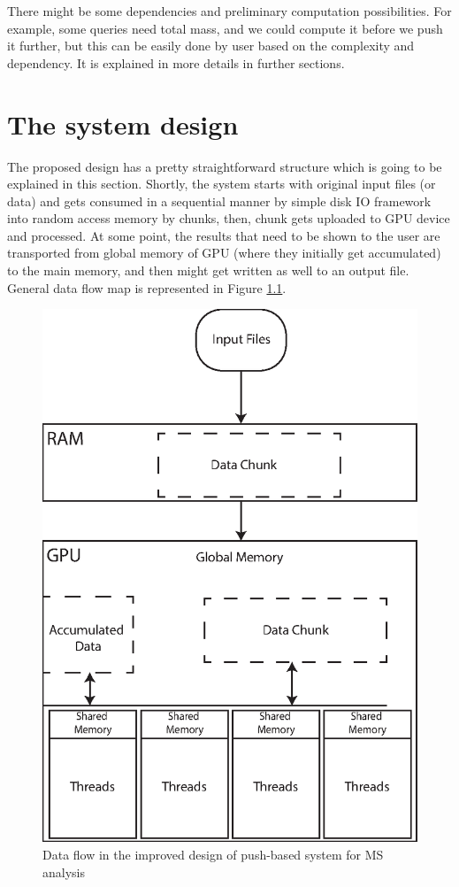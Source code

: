 \documentclass[12pt,letterpaper]{report}
\begin{document}
There might be some dependencies and preliminary computation possibilities. For example, some queries need total mass, and we could compute it before we push it further, but this can be easily done by user based on the complexity and dependency. It is explained in more details in further sections.

\chapter{The system design}\label{sc:system}

\hspace{3em} The proposed design has a pretty straightforward structure which is going to be explained in this section. Shortly, the system starts with original input files (or data) and gets consumed in a sequential manner by simple disk IO framework into random access memory by chunks, then, chunk gets uploaded to GPU device and processed. At some point, the results that need to be shown to the user are transported from global memory of GPU (where they initially get accumulated) to the main memory, and then might get written as well to an output file. General data flow map is represented in Figure  \ref{fg:data-flow}.

\begin{figure}
 \centerline{ \includegraphics[width=0.65\columnwidth]{images/memory-organization.eps} }
 \caption{Data flow in the improved design of push-based system for MS analysis}
 \label{fg:data-flow}
\end{figure}
\end{document}
